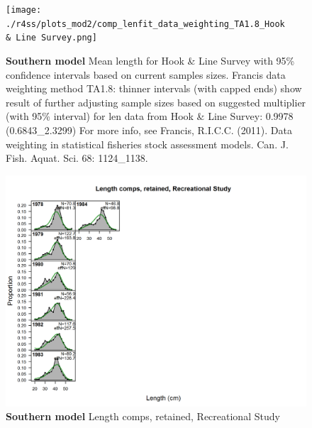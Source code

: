 \documentclass[12pt,]{article}
\begin{document}
\begin{figure}[htbp]
\centering
\texttt{[image: ./r4ss/plots\_mod2/comp\_lenfit\_data\_weighting\_TA1.8\_Hook \\\& Line Survey.png]}
\caption{\textbf{Southern model} Mean length for Hook \& Line Survey
with 95\% confidence intervals based on current samples sizes. Francis
data weighting method TA1.8: thinner intervals (with capped ends) show
result of further adjusting sample sizes based on suggested multiplier
(with 95\% interval) for len data from Hook \& Line Survey: 0.9978
(0.6843\_2.3299) For more info, see Francis, R.I.C.C. (2011). Data
weighting in statistical fisheries stock assessment models. Can. J.
Fish. Aquat. Sci. 68: 1124\_1138.
\label{fig:mod2_16_comp_lenfit_data_weighting_TA1.8_Hook & Line Survey}}
\end{figure}

\begin{figure}[htbp]
\centering
\includegraphics{./r4ss/plots_mod2/comp_lenfit_flt5mkt2.png}
\caption{\textbf{Southern model} Length comps, retained, Recreational
Study \label{fig:mod2_17_comp_lenfit_flt5mkt2}}
\end{figure}
\end{document}
